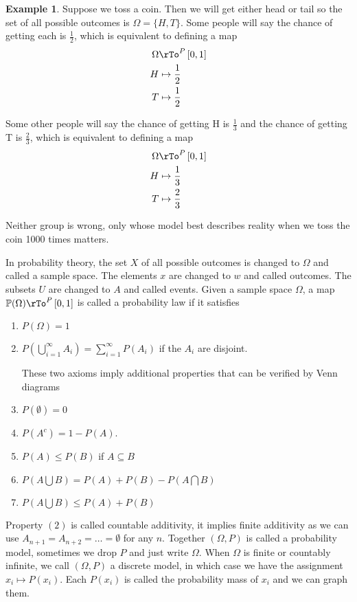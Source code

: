 \documentclass[12pt]{amsart}
\theoremstyle{definition}
\newtheorem{example}[theorem]{Example}
\begin{document}
\begin{example} Suppose we toss a coin. Then we will get either head or tail so the set of all possible outcomes is $\Omega = \{H, T\}$. Some people will say the chance of getting each is $\frac{1}{2}$, which is equivalent to defining a map
\begin{align*}
\Omega & \rTo^P \, [0,1] \\
H & \mapsto \frac{1}{2} \\
T & \mapsto \frac{1}{2}
\end{align*}

Some other people will say the chance of getting H is $\frac{1}{3}$ and the chance of getting T is $\frac{2}{3}$, which is equivalent to defining a map
\begin{align*}
\Omega & \rTo^P \, [0,1] \\
H & \mapsto \frac{1}{3} \\
T & \mapsto \frac{2}{3}
\end{align*}

Neither group is wrong, only whose model best describes reality when we toss the coin 1000 times matters.
\end{example}
In probability theory, the set $X$ of all possible outcomes is changed to $\Omega$ and called a sample space. The elements $x$ are changed to $w$ and called outcomes. The subsets $U$ are changed to $A$ and called events.
\dfn Given a sample space $\Omega$, a map $\mathbb{P}(\Omega) \rTo^{P} \, [0,1]$ is called a probability law if it satisfies
\begin{enumerate}[1.]
\item $P(\Omega) = 1$
\item $P(\bigcup\limits_{i=1}^{\infty} A_i) = \sum\limits_{i=1}^{\infty} P(A_i)$ if the $A_i$ are disjoint.

These two axioms imply additional properties that can be verified by Venn diagrams
\item $P(\emptyset) = 0$
\item $P(A^c) = 1 - P(A)$.
\item $P(A) \leq P(B)$ if $A \subseteq B$
\item $P(A \bigcup B) = P(A) + P(B) - P(A \bigcap B)$
\item $P(A \bigcup B)  \leq P(A) + P(B)$
\end{enumerate}

Property $(2)$ is called countable additivity, it implies finite additivity as we can use $A_{n+1} = A_{n+2} = \ldots = \emptyset$ for any $n$. Together $(\Omega, P)$ is called a probability model, sometimes we drop $P$ and just write $\Omega$. When $\Omega$ is finite or countably infinite, we call $(\Omega, P)$ a discrete model, in which case we have the assignment $x_i \mapsto P(x_i)$. Each $P(x_i)$ is called the probability mass of $x_i$ and we can graph them.
\end{document}

